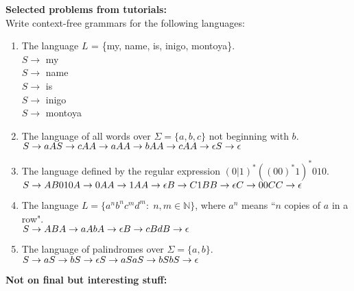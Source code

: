 \documentclass[12pt]{article}
\begin{document}
\noindent
\textbf{Selected problems from tutorials:}\\

\noindent
Write context-free grammars for the following languages:
\begin{enumerate}[label=(\alph*)]
	\item The language $L$ = \{my, name, is, inigo, montoya\}.\\
	$S \rightarrow$ my\\
	$S \rightarrow$ name\\
	$S \rightarrow$ is\\
	$S \rightarrow$ inigo\\
	$S \rightarrow$ montoya
	\item The language of all words over $\Sigma = \{a,b,c\}$ not beginning with $b$.\\
	$S \rightarrow aA\\
	S \rightarrow cA\\
	A \rightarrow aA\\
	A \rightarrow bA\\
	A \rightarrow cA\\
	A \rightarrow \epsilon\\
	S \rightarrow \epsilon$
	\item The language defined by the regular expression $(0|1)^{\ast}((00)^{\ast}1)^{\ast}010$.\\
	$S \rightarrow AB010\\
	A \rightarrow 0A\\
	A \rightarrow 1A \\
	A \rightarrow \epsilon\\
	B \rightarrow C1B\\
	B \rightarrow \epsilon\\
	C \rightarrow 00C\\
	C \rightarrow \epsilon\\	
	$
	\item The language $L=\{a^n b^n c^m d^m:\;n,m\in \mathbb{N} \}$, where $a^n$ means ``$n$ copies of $a$ in a row".\\
	$S \rightarrow AB\\
	A \rightarrow aAb\\
	A \rightarrow \epsilon\\
	B \rightarrow cBd \\
	B \rightarrow \epsilon$
	\item The language of palindromes over $\Sigma=\{a, b\}$. \\	
	$
	S \rightarrow a\\
	S \rightarrow b\\
	S \rightarrow \epsilon\\
	S \rightarrow aSa\\
	S \rightarrow bSb\\
	S \rightarrow \epsilon$
    \end{enumerate}
\clearpage
\noindent
\textbf{Not on final but interesting stuff:}\\
\end{document}
